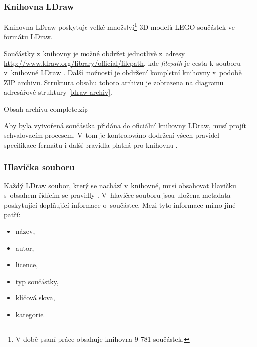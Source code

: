     \subsubsection*{Knihovna LDraw}\label{ldraw-knihovna}
    Knihovna LDraw poskytuje velké množství\footnote{V době psaní práce obsahuje knihovna 9 781 součástek.} 3D modelů LEGO součástek ve formátu LDraw.

    Součástky z~knihovny je možné obdržet jednotlivě z~adresy \\ \url{http://www.ldraw.org/library/official/filepath}, kde \textit{filepath} je cesta k~souboru v~knihovně LDraw \autocite{ldraw:download}. Další možností je obdržení kompletní knihovny v~podobě ZIP archivu. Struktura obsahu tohoto archivu je zobrazena na diagramu adresářové struktury \ref{ldraw-archiv}.

    \begin{dirfigure}%
        \caption{Obsah archivu complete.zip}\label{ldraw-archiv}
    \end{dirfigure}

    Aby byla vytvořená součástka přidána do oficiální knihovny LDraw, musí projít schvalovacím procesem. V~tom je kontrolováno dodržení všech pravidel specifikace formátu \autocite{ldraw:file:specification} i další pravidla platná pro knihovnu \cite{ldraw:library:restrictions}.

    \subsubsection*{Hlavička souboru}\label{ldraw-hlavicka}
        Každý LDraw soubor, který se nachází v~knihovně, musí obsahovat hlavičku s~obsahem řídícím se pravidly \autocite{ldraw:header:specification}. V~hlavičce souboru jsou uložena metadata poskytující doplňující informace o~součástce. Mezi tyto informace mimo jiné patří:
        \begin{itemize}
            \item název,
            \item autor,
            \item licence,
            \item typ součástky,
            \item klíčová slova,
            \item kategorie.
        \end{itemize}
 
